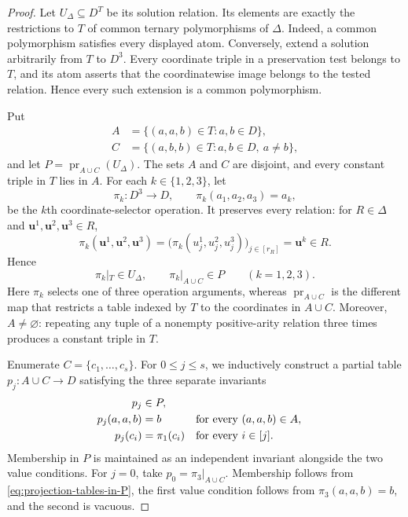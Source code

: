 \documentclass[11pt]{article}
\theoremstyle{plain}
\theoremstyle{definition}
\theoremstyle{remark}
\DeclareMathOperator{\pr}{pr}
\begin{document}
\begin{proof}
Let $U_\Delta\subseteq D^T$ be its solution relation.  Its elements are
exactly the restrictions to $T$ of common ternary polymorphisms of $\Delta$.
Indeed, a common polymorphism satisfies every displayed atom.  Conversely,
extend a solution arbitrarily from $T$ to $D^3$.  Every coordinate triple in
a preservation test belongs to $T$, and its atom asserts that the
coordinatewise image belongs to the tested relation.  Hence every such
extension is a common polymorphism.

Put
\begin{equation*}
  \begin{aligned}
    A&=\{(a,a,b)\in T:a,b\in D\},\\
    C&=\{(a,b,b)\in T:a,b\in D,\ a\ne b\},
  \end{aligned}
\end{equation*}
and let $P=\pr_{A\cup C}(U_\Delta)$.  The sets $A$ and $C$ are disjoint,
and every constant triple in $T$ lies in $A$.  For each $k\in\{1,2,3\}$,
let
\[
  \pi_k:D^3\to D,
  \qquad
  \pi_k(a_1,a_2,a_3)=a_k,
\]
be the $k$th coordinate-selector operation.  It preserves every relation:
for $R\in\Delta$ and
$\mathbf u^1,\mathbf u^2,\mathbf u^3\in R$,
\[
  \pi_k(\mathbf u^1,\mathbf u^2,\mathbf u^3)
  =\bigl(\pi_k(u^1_j,u^2_j,u^3_j)\bigr)_{j\in[r_R]}
  =\mathbf u^k\in R.
\]
Hence
\begin{equation}
  \pi_k|_T\in U_\Delta,
  \qquad
  \pi_k|_{A\cup C}\in P
  \qquad(k=1,2,3).
  \label{eq:projection-tables-in-P}
\end{equation}
Here $\pi_k$ selects one of three operation arguments, whereas
$\pr_{A\cup C}$ is the different map that restricts a table indexed by $T$
to the coordinates in $A\cup C$.  Moreover,
$A\ne\varnothing$: repeating any tuple of a nonempty positive-arity relation
three times produces a constant triple in $T$.

Enumerate $C=\{c_1,\ldots,c_s\}$.  For $0\le j\le s$, we inductively
construct a partial table $p_j:A\cup C\to D$ satisfying the three separate
invariants
\begin{align}
  p_j&\in P,
    \notag\\
  p_j(a,a,b)&=b
    &&\text{for every }(a,a,b)\in A,
    \notag\\
  p_j(c_i)&=\pi_1(c_i)
    &&\text{for every }i\in[j].
    \label{eq:partial-maltsev-c}
\end{align}
Membership in $P$ is maintained as an independent invariant alongside the
two value conditions.  For
$j=0$, take $p_0=\pi_3|_{A\cup C}$.  Membership follows from
\eqref{eq:projection-tables-in-P}, the first value condition follows from
$\pi_3(a,a,b)=b$, and the second is vacuous.


\end{proof}
\end{document}
